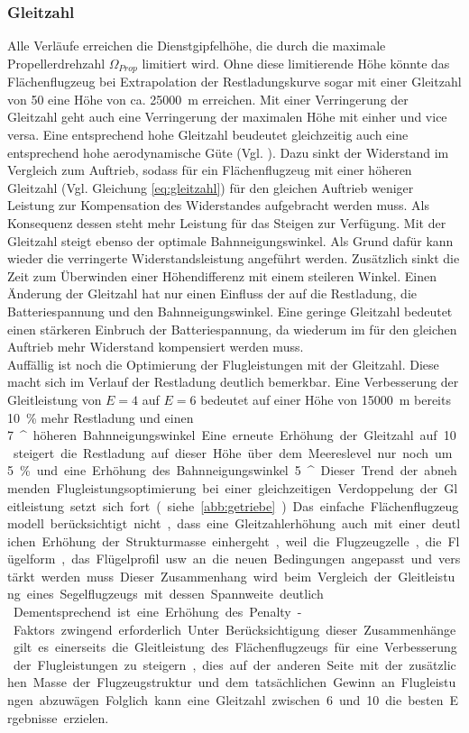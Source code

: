 \subsubsection{Gleitzahl}
\label{subsubsec:gleitzahl}
Alle Verläufe erreichen die Dienstgipfelhöhe, die durch die maximale Propellerdrehzahl \ensuremath{\Omega_{Prop}} limitiert wird. Ohne diese limitierende Höhe könnte das Flächenflugzeug bei Extrapolation der Restladungskurve sogar mit einer Gleitzahl von 50 eine Höhe von ca. \SI{25000}{m} erreichen. 
Mit einer Verringerung der Gleitzahl geht auch eine Verringerung der maximalen Höhe mit einher und vice versa. Eine entsprechend hohe Gleitzahl beudeutet gleichzeitig auch eine entsprechend hohe aerodynamische Güte (Vgl. \cite[S.34]{Scheiderer.2008}). Dazu sinkt der Widerstand im Vergleich zum Auftrieb, sodass für ein Flächenflugzeug mit einer höheren Gleitzahl (Vgl. Gleichung \ref{eq:gleitzahl}) für den gleichen Auftrieb weniger Leistung zur Kompensation des Widerstandes aufgebracht werden muss. Als Konsequenz dessen steht mehr Leistung für das Steigen zur Verfügung. Mit der Gleitzahl steigt ebenso der optimale Bahnneigungswinkel. Als Grund dafür kann wieder die verringerte Widerstandsleistung angeführt werden. Zusätzlich sinkt die Zeit zum Überwinden einer Höhendifferenz mit einem steileren Winkel. Einen Änderung der Gleitzahl hat nur einen Einfluss der auf die Restladung, die Batteriespannung und den Bahnneigungswinkel. Eine geringe Gleitzahl bedeutet einen stärkeren Einbruch der Batteriespannung, da wiederum im für den gleichen Auftrieb mehr Widerstand kompensiert werden muss. \\
Auffällig ist noch die Optimierung der Flugleistungen mit der Gleitzahl. Diese macht sich im Verlauf der Restladung deutlich bemerkbar. Eine Verbesserung der Gleitleistung von \ensuremath{E = 4} auf \ensuremath{E = 6} bedeutet auf einer Höhe von \SI{15000}{m} bereits \SI{10}{\%} mehr Restladung und einen \SI{7}{^\circ} höheren Bahnneigungswinkel. Eine erneute Erhöhung der Gleitzahl auf 10 steigert die Restladung auf dieser Höhe über dem  Meereslevel nur noch um \SI{5}{\%} und eine Erhöhung des Bahnneigungswinkel \SI{5}{^\circ}. Dieser Trend der abnehmenden Flugleistungsoptimierung bei einer gleichzeitigen Verdoppelung der Gleitleistung setzt sich fort (siehe \ref{abb:getriebe}).
Das einfache Flächenflugzeugmodell berücksichtigt nicht, dass eine Gleitzahlerhöhung auch mit einer deutlichen Erhöhung der Strukturmasse einhergeht, weil die Flugzeugzelle, die Flügelform, das Flügelprofil usw. an die neuen Bedingungen angepasst und verstärkt werden muss. Dieser Zusammenhang wird beim Vergleich der Gleitleistung eines Segelflugzeugs mit dessen Spannweite deutlich. \\
Dementsprechend ist eine Erhöhung des Penalty-Faktors zwingend erforderlich. Unter Berücksichtigung dieser Zusammenhänge gilt es einerseits die Gleitleistung des Flächenflugzeugs für eine Verbesserung der Flugleistungen zu steigern, dies auf der anderen Seite mit der zusätzlichen Masse der Flugzeugstruktur und dem tatsächlichen Gewinn an Flugleistungen abzuwägen. Folglich kann eine Gleitzahl zwischen 6 und 10 die besten Ergebnisse erzielen.

